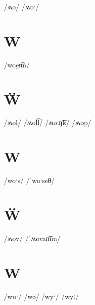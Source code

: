 \documentclass[10pt,a4paper,twoside]{book}
\begin{document}
\begin{multicols}{3}
 {/ʍo/} {}
 {/ʍoˑ/} {}
\end{multicols}

\section*{W}

\begin{multicols}{3}
 {/woe̯n͡n/} {}
\end{multicols}

\section*{Ẅ}

\begin{multicols}{3}
 {/ʍol/} {}
 {/ʍol͡l/} {}
 {/ʍoːŋ͡k/} {}
 {/ʍop/} {}
\end{multicols}

\section*{W}

\begin{multicols}{3}
 {/woˑs/} {}
 {/ˈwoˑseθ/} {}
\end{multicols}

\section*{Ẅ}

\begin{multicols}{3}
 {/ʍov/} {}
 {/ˈʍovam͡m/} {}
\end{multicols}

\section*{W}

\begin{multicols}{3}
 {/wuˑ/} {}
 {/wø/} {}
 {/wyˑ/} {}
 {/wyː/} {}
\end{multicols}
\end{document}
